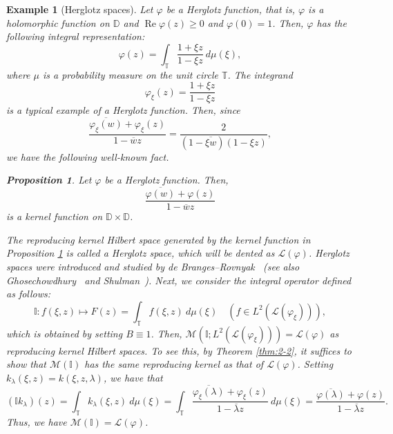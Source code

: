 \documentclass[12pt]{article}
\newtheorem{ex}[thm]{Example}
\newtheorem{prop}[thm]{Proposition}
\numberwithin{equation}{section}
\newcommand{\M}{{\mathcal M}}
\newcommand{\cL}{{\mathcal L}}
\newcommand{\D}{{\mathbb D}}
\newcommand{\bT}{{\mathbb T}}
\newcommand{\bI}{{\mathbb I}}
\newcommand{\lam}{\lambda}
\begin{document}
\begin{ex}[Herglotz spaces]\label{sec:1-1-6}\rm 
Let $\varphi$ be a Herglotz function, that is, 
$\varphi$ is a holomorphic function on $\D$ and $\operatorname{Re}\varphi(z)\geq 0$ and $\varphi(0)=1$.  
Then, 
$\varphi$ has the following integral representation: 
\[
\varphi(z)=\int_{\bT}\frac{1+\xi z}{1-\xi z}\ d\mu(\xi),
\]
where $\mu$ is a probability measure on the unit circle $\bT$. 
The integrand 
\[
\varphi_{\xi}(z)=\frac{1+\xi z}{1-\xi z}
\]
is a typical example of a Herglotz function. 
Then, since
\begin{equation}\label{eq:3-3}
\frac{\overline{\varphi_{\xi}(w)}+\varphi_{\xi}(z)}{1-\overline{w}z}=
\frac{2}{(1-\overline{\xi w})(1-\xi z)},
\end{equation}
we have the following well-known fact.
\begin{prop}\label{prop:1-3}
Let $\varphi$ be a Herglotz function. Then, 
\[
\dfrac{\overline{\varphi(w)}+\varphi(z)}{1-\overline{w}z}
\]
is a kernel function on $\D\times \D$.
\end{prop}

The reproducing kernel Hilbert space generated by the kernel function in Proposition \ref{prop:1-3} 
is called a Herglotz space, which will be dented as $\cL(\varphi)$. 
Herglotz spaces were introduced and studied by de Branges--Rovnyak~\cite{dBR} 
(see also Ghosechowdhury~\cite{G1,G2} and Shulman~\cite{S}). 
Next, we consider the integral operator defined as follows: 
\[
\bI: 
f(\xi,z) \mapsto F(z)=\int_{\bT} f(\xi,z)\ d\mu(\xi) \quad (f\in L^2(\cL(\varphi_{\xi}))),
\]
which is obtained by setting $B\equiv 1$. 
Then,  
$\M(\bI; L^2(\cL(\varphi_{\xi})))=\cL(\varphi)$ as reproducing kernel Hilbert spaces. 
To see this, by Theorem \ref{thm:2-2}, 
it suffices to show that $\M(\bI)$ has the same reproducing kernel as that of $\cL(\varphi)$.   
Setting $k_{\lam}(\xi,z)=k(\xi,z,\lam)$, we have that 
\[
(\bI k_{\lam})(z)=\int_{\bT}k_{\lam}(\xi,z)\ d\mu(\xi)
=\int_{\bT} \frac{\overline{\varphi_{\xi}(\lam)}+\varphi_{\xi}(z)}{1-\overline{\lam} z}\ d\mu(\xi)
=\frac{\overline{\varphi(\lam)}+\varphi(z)}{1-\overline{\lam} z}. 
\]
Thus, we have $\M(\bI)=\cL(\varphi)$. 
\end{ex}
\end{document}
